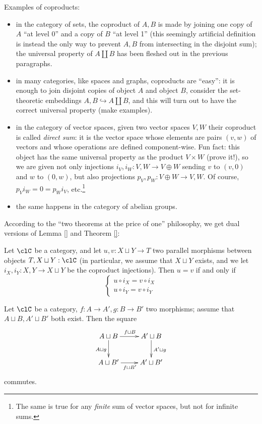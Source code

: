 \documentclass[11pt]{article}
\begin{document}
Examples of coproducts:
\begin{itemize}
	\item in the category of sets, the coproduct of $A,B$ is made by joining one copy of $A$ ``at level 0'' and a copy of $B$ ``at level 1'' (this seemingly artificial definition is instead the only way to prevent $A,B$ from intersecting in the disjoint sum); the universal property of $A\coprod B$ has been fleshed out in the previous paragraphs.
	\item in many categories, like spaces and graphs, coproducts are ``easy'': it is enough to join disjoint copies of object \(A\) and object \(B\), consider the set-theoretic embeddings $A , B \hookrightarrow A\coprod B$, and this will turn out to have the correct universal property (make examples).
	\item in the category of vector spaces, given two vector spaces $V,W$ their coproduct is called \emph{direct sum}: it is the vector space whose elements are pairs $(v,w)$ of vectors and whose operations are defined component-wise. Fun fact: this object has the same universal property as the product $V\times W$ (prove it!), so we are given not only injections $i_V,i_W : V,W\to V\oplus W$ sending $v$ to $(v,0)$ and $w$ to $(0,w)$, but also projections $p_V,p_W : V\oplus W \to V,W$. Of course, $p_Vi_W=0=p_Wi_V$, etc.\footnote{The same is true for any \emph{finite} sum of vector spaces, but not for infinite sums.}
	\item the same happens in the category of abelian groups.
\end{itemize}
According to the ``two theorems at the price of one'' philosophy, we get dual versions of Lemma \ref{} and Theorem \ref{}:
\begin{lemma}
	Let $\clC$ be a category, and let $u,v : X\sqcup Y \to T$ two parallel morphisms between objects $T, X\sqcup Y : \clC$ (in particular, we assume that $X\sqcup Y$ exists, and we let $i_X,i_Y : X,Y\to X\sqcup Y$ be the coproduct injections). Then $u=v$ if and only if
	\begin{equation*}
		\begin{cases}
			u \circ i_X= v\circ i_X \\
			 u\circ i_Y =  v\circ i_Y
		\end{cases}
	\end{equation*}
\end{lemma}
\begin{theorem}
	Let $\clC$ be a category, $f : A \to A', g : B\to B'$ two morphisms; assume that $A\sqcup B, A'\sqcup B'$ both exist. Then the square
	\[
		\vcenter{\xymatrix{
				A\sqcup B\ar[d]_{A\sqcup g}\ar[r]^{f\sqcup B} & A^\prime\sqcup B \ar[d]^{A^\prime\sqcup g}\\
				A\sqcup B^\prime \ar[r]_{f\sqcup B^\prime}& A^\prime\sqcup B^\prime
			}}
	\]
	commutes.
\end{theorem}
\end{document}

